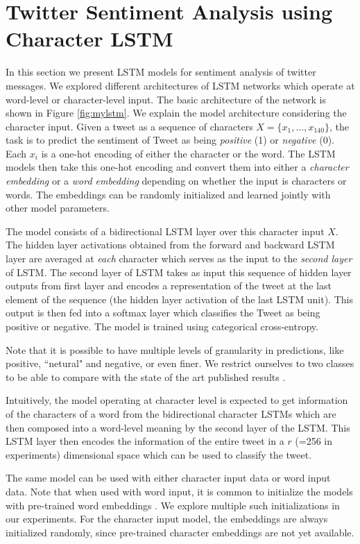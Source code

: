 \documentclass{article} %
\begin{document}
\section{Twitter Sentiment Analysis using Character LSTM}
In this section we present LSTM models for sentiment analysis of twitter messages. We explored different architectures of LSTM networks which operate at word-level or character-level input. The basic architecture of the network is shown in Figure \ref{fig:mylstm}.
We explain the model architecture considering the character input.
Given a tweet as a sequence of characters $X=\{x_1, \ldots, x_{140}\}$, the task is to predict the sentiment of Tweet as being {\it positive} (1) or {\it negative} (0). Each $x_i$ is a one-hot encoding of either the character or the word. The LSTM models then take this one-hot encoding and convert them into either a {\it character embedding} or a {\it word embedding} depending on whether the input is characters or words. The embeddings can be randomly initialized and learned jointly with other model parameters.

The model consists of a bidirectional LSTM layer over this character input $X$. The hidden layer activations obtained from the forward and backward LSTM layer are averaged at {\it each} character which serves as the input to the {\it second layer} of LSTM. The second layer of LSTM takes as input this sequence of hidden layer outputs from first layer and encodes a representation of the tweet at the last element of the sequence (the hidden layer activation of the last LSTM unit). This output is then fed into a softmax layer which classifies the Tweet as being positive or negative.
The model is trained using categorical cross-entropy.

Note that it is possible to have multiple levels of granularity in predictions, like positive, ``netural" and negative, or even finer.
We restrict ourselves to two classes to be able to compare with the state of the art published results \cite{kalchbrenner2014convolutional}.

Intuitively, the model operating at character level is expected to get information of the characters of a word from the bidirectional character LSTMs which are then composed into a word-level meaning by the second layer of the LSTM. This LSTM layer then encodes the information of the entire tweet in a $r$ (=256 in experiments) dimensional space which can be used to classify the tweet.

The same model can be used with either character input data or word input data. Note that when used with word input, it is common to initialize the models with pre-trained word embeddings \cite{mikolov2013distributed}. We explore multiple such initializations in our experiments.
For the character input model, the embeddings are always initialized randomly, since pre-trained character embeddings are not yet available.
\end{document}
